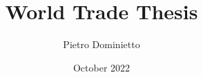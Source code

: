 \documentclass[a4paper,12pt]{report}
\title{World Trade Thesis}
\author{Pietro Dominietto}
\date{October 2022}
\begin{document}
\maketitle


\begin{singlespace}

\tableofcontents

\listoftables
\listoffigures
\end{singlespace}
\pagebreak







\begin{singlespace}
% 
\printbibliography

\appendix

\end{singlespace}
\end{document}
